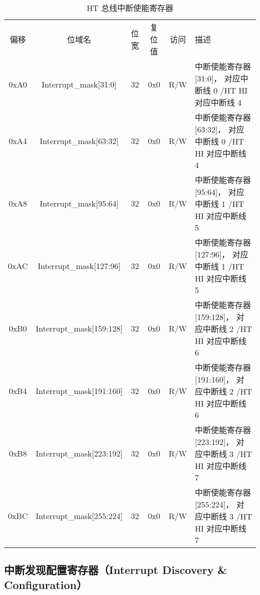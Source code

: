 \begin{table}
  \centering
  \begin{tabular}{|c|c|c|c|c|p{6cm}|} \hline
    偏移  & 位域名   & 位宽 & 复位值 & 访问 & 描述 \\ \hhline
    0xA0 & Interrupt\_mask[31:0]    & 32 & 0x0 & R/W & 中断使能寄存器[31:0]，   对应中断线 0 /HT HI 对应中断线 4 \\
    0xA4 & Interrupt\_mask[63:32]   & 32 & 0x0 & R/W & 中断使能寄存器[63:32]，  对应中断线 0 /HT HI 对应中断线 4 \\
    0xA8 & Interrupt\_mask[95:64]   & 32 & 0x0 & R/W & 中断使能寄存器[95:64]，  对应中断线 1 /HT HI 对应中断线 5 \\
    0xAC & Interrupt\_mask[127:96]  & 32 & 0x0 & R/W & 中断使能寄存器[127:96]， 对应中断线 1 /HT HI 对应中断线 5 \\
    0xB0 & Interrupt\_mask[159:128] & 32 & 0x0 & R/W & 中断使能寄存器[159:128]， 对应中断线 2 /HT HI 对应中断线 6 \\
    0xB4 & Interrupt\_mask[191:160] & 32 & 0x0 & R/W & 中断使能寄存器[191:160]， 对应中断线 2 /HT HI 对应中断线 6 \\
    0xB8 & Interrupt\_mask[223:192] & 32 & 0x0 & R/W & 中断使能寄存器[223:192]， 对应中断线 3 /HT HI 对应中断线 7 \\
    0xBC & Interrupt\_mask[255:224] & 32 & 0x0 & R/W & 中断使能寄存器[255:224]， 对应中断线 3 /HT HI 对应中断线 7 \\
    \hline
  \end{tabular}
  \caption{HT 总线中断使能寄存器}
  \label{tab:htintenable}
\end{table}

\subsection{中断发现配置寄存器（Interrupt Discovery \& Configuration）}

